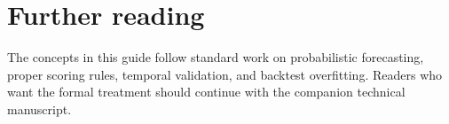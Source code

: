 \documentclass[11pt]{article}
\begin{document}
\section{Further reading}
The concepts in this guide follow standard work on probabilistic forecasting, proper scoring rules, temporal validation, and backtest overfitting. Readers who want the formal treatment should continue with the companion technical manuscript.



\end{document}
